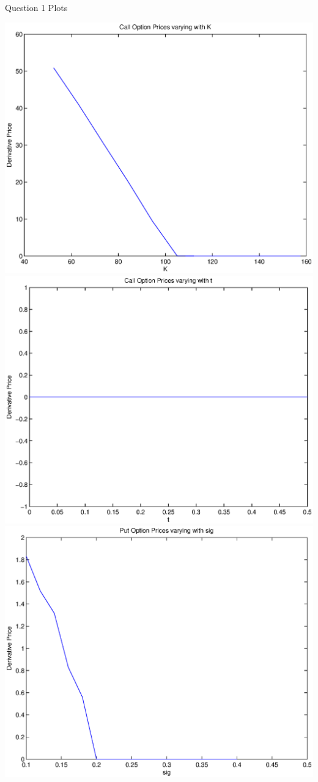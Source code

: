 \documentclass{article}
\begin{document}
\graphicspath{ {plots/}}
\Large  Question 1 Plots

\includegraphics[width=\textwidth]{Call_Option_Prices_varying_with_K}
\includegraphics[width=\textwidth]{Call_Option_Prices_varying_with_t}
\includegraphics[width=\textwidth]{Put_Option_Prices_varying_with_sig}
\end{document}
